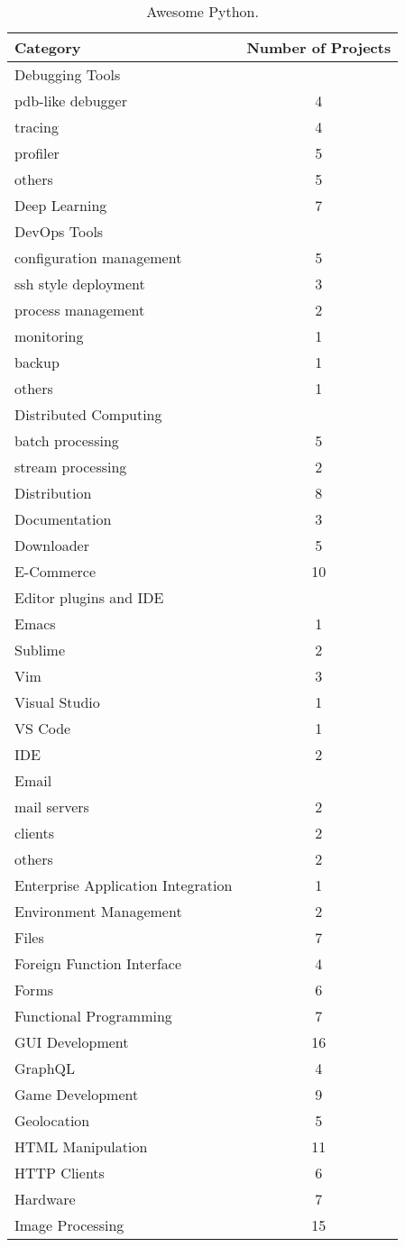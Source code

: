 \begin{table}[ht]
\centering
\begin{tabular}{|l|c|}
\hline
\textbf{Category} & \textbf{Number of Projects}\\
\hline
Debugging Tools & \\
pdb-like debugger & 4\\
tracing & 4\\
profiler & 5\\
others & 5\\
Deep Learning & 7\\
DevOps Tools & \\
configuration management & 5\\
ssh style deployment & 3\\
process management & 2\\
monitoring & 1\\
backup & 1\\
others & 1\\
Distributed Computing & \\
batch processing & 5\\
stream processing & 2\\
Distribution & 8\\
Documentation & 3\\
Downloader & 5\\
E-Commerce & 10\\
Editor plugins and IDE & \\
Emacs & 1\\
Sublime & 2\\
Vim & 3\\
Visual Studio & 1\\
VS Code & 1\\
IDE & 2\\
Email & \\
mail servers & 2\\
clients & 2\\
others & 2\\
Enterprise Application Integration & 1\\
Environment Management & 2\\
Files & 7\\
Foreign Function Interface & 4\\
Forms & 6\\
Functional Programming & 7\\
GUI Development & 16\\
GraphQL & 4\\
Game Development & 9\\
Geolocation & 5\\
HTML Manipulation & 11\\
HTTP Clients & 6\\
Hardware & 7\\
Image Processing & 15\\
\hline
\end{tabular}
\caption[Awesome Python]{\label{table:awesome-python2}Awesome Python.}
\end{table}

